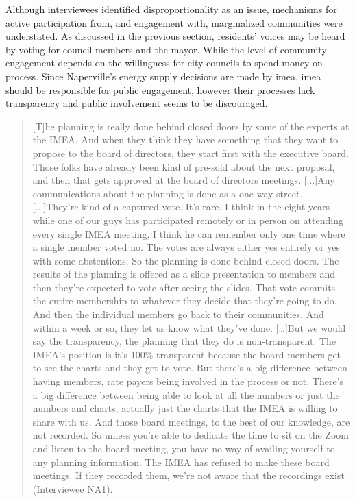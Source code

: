 Although interviewees identified disproportionality as an issue, mechanisms for
active participation from, and engagement with, marginalized communities were
understated. As discussed in the previous section, residents' voices may be
heard by voting for council members and the mayor. While the level of community
engagement depends on the willingness for city councils to spend money on
process. Since Naperville's energy supply decisions are made by \ac{imea},
\ac{imea} should be responsible for public engagement, however their processes
lack transparency and public involvement seems to be discouraged.
\begin{quote}
    [T]he planning is really done behind closed doors by some of the
    experts at the IMEA. And when they think they have something that they want
    to propose to the board of directors, they start first with the executive
    board. Those folks have already been kind of pre-sold about the next
    proposal, and then that gets approved at the board of directors meetings.
    [...]Any communications about the planning is done as a one-way street. 
    [...]They're kind of a captured vote. It's
    rare. I think in the eight years while one of our guys has participated
    remotely or in person on attending every single IMEA meeting, I think he can
    remember only one time where a single member voted no. The votes are always
    either yes entirely or yes with some abstentions. So the planning is done
    behind closed doors. The results of the planning is offered as a slide
    presentation to members and then they're expected to vote after seeing the
    slides. That vote commits the entire membership to whatever they decide that
    they're going to do. And then the individual members go back to their
    communities. And within a week or so, they let us know what they've done.
   [\dots]But we would say the transparency, the
    planning that they do is non-transparent. The IMEA's position is it's 100\%
    transparent because the board members get to see the charts and they get to
    vote. But there's a big difference between having members, rate payers being
    involved in the process or not. There's a big difference between being able
    to look at all the numbers or just the numbers and charts, actually just the
    charts that the IMEA is willing to share with us. And those board meetings,
    to the best of our knowledge, are not recorded. So unless you're able to
    dedicate the time to sit on the Zoom and listen to the board meeting, you
    have no way of availing yourself to any planning information. The IMEA has
    refused to make these board meetings. If they recorded them, we're not aware
    that the recordings exist (Interviewee NA1).
\end{quote}


